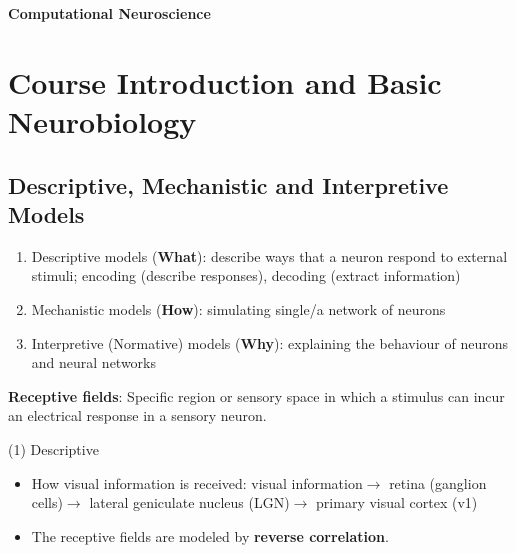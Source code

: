 \documentclass[11pt]{article}
\begin{document}
\begin{center}
    \begin{large}
        \textbf{Computational Neuroscience}
    \end{large}
\end{center}
\tableofcontents

\newpage
\section{Course Introduction and Basic Neurobiology}
\subsection{Descriptive, Mechanistic and Interpretive Models}
\begin{enumerate}
    \item Descriptive models (\textbf{What}): describe ways that a neuron respond to external stimuli; encoding (describe responses), decoding (extract information)
    \item Mechanistic models (\textbf{How}): simulating single/a network of neurons
    \item Interpretive (Normative) models (\textbf{Why}): explaining the behaviour of neurons and neural networks
\end{enumerate}
\noindent \textbf{Receptive fields}: Specific region or sensory space in which a stimulus can incur an electrical response in a sensory neuron.

(1) Descriptive
\begin{itemize}
    \item How visual information is received: visual information$\rightarrow$ retina (ganglion cells)$\rightarrow$ lateral geniculate nucleus (LGN)$\rightarrow$ primary visual cortex (v1)
    \begin{center}
    \end{center}
    \item The receptive fields are modeled by \textbf{reverse correlation}.
\end{itemize}
\end{document}
